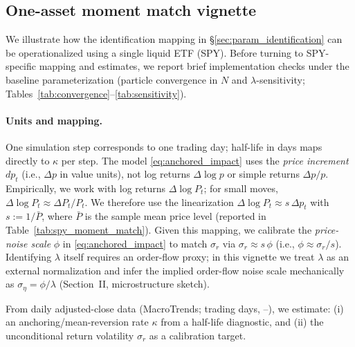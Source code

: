 
\subsection{One-asset moment match vignette}
\label{sec:moment_match_vignette}

We illustrate how the identification mapping in \S\ref{sec:param_identification} can be operationalized using a single liquid ETF (SPY).
Before turning to SPY-specific mapping and estimates, we report brief implementation checks under the baseline parameterization (particle convergence in $N$ and $\lambda$-sensitivity; Tables~\ref{tab:convergence}--\ref{tab:sensitivity}).

\paragraph{Units and mapping.}
One simulation step corresponds to one trading day; half-life in days maps directly to $\kappa$ per step.
The model \eqref{eq:anchored_impact} uses the \emph{price increment} $dp_t$ (i.e., $\Delta p$ in value units), not log returns $\Delta\log p$ or simple returns $\Delta p/p$.
Empirically, we work with log returns $\Delta\log P_t$; for small moves, $\Delta\log P_t \approx \Delta P_t/P_t$. We therefore use the linearization
$\Delta\log P_t \approx s\,\Delta p_t$ with $s:=1/\bar P$, where $\bar P$ is the sample mean price level (reported in Table~\ref{tab:spy_moment_match}).
Given this mapping, we calibrate the \emph{price-noise scale} $\phi$ in \eqref{eq:anchored_impact} to match $\sigma_r$ via $\sigma_r \approx s\,\phi$ (i.e., $\phi \approx \sigma_r/s$).
Identifying $\lambda$ itself requires an order-flow proxy; in this vignette we treat $\lambda$ as an external normalization and infer the implied order-flow noise scale mechanically as $\sigma_\eta=\phi/\lambda$ (Section~II, microstructure sketch).

From daily adjusted-close data (MacroTrends;  trading days, --), we estimate:
(i) an anchoring/mean-reversion rate $\kappa$ from a half-life diagnostic, and
(ii) the unconditional return volatility $\sigma_r$ as a calibration target.

